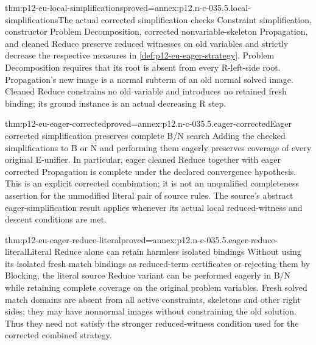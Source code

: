\begin{hblemma}{thm:p12-eu-local-simplifications}{proved=annex:p12.n-c-035.5.local-simplifications}{The actual corrected simplification checks}
Constraint simplification, constructor Problem Decomposition, corrected
nonvariable-skeleton Propagation, and cleaned Reduce preserve reduced
witnesses on old variables and strictly decrease the respective measures
in \cref{def:p12-eu-eager-strategy}. Problem Decomposition requires
that its root is absent from every R-left-side root. Propagation's
new image is a normal subterm of an old normal solved image. Cleaned
Reduce constrains no old variable and introduces no retained fresh
binding; its ground instance is an actual decreasing R step.
\end{hblemma}

\begin{hbtheorem}{thm:p12-eu-eager-corrected}{proved=annex:p12.n-c-035.5.eager-corrected}{Eager corrected simplification preserves complete B/N search}
Adding the checked simplifications to B or N and performing them
eagerly preserves coverage of every original E-unifier. In particular,
eager cleaned Reduce together with eager corrected Propagation is
complete under the declared convergence hypothesis. This is an
explicit corrected combination; it is not an unqualified completeness
assertion for the unmodified literal pair of source rules.
The source's abstract eager-simplification result applies whenever
its actual local reduced-witness and descent conditions are met.
\cite[Theorem 4.17, p.~500]{BaaderSnyder2001}
\end{hbtheorem}

\begin{hbtheorem}{thm:p12-eu-eager-reduce-literal}{proved=annex:p12.n-c-035.5.eager-reduce-literal}{Literal Reduce alone can retain harmless isolated bindings}
Without using its isolated fresh match bindings as reduced-term
certificates or rejecting them by Blocking, the literal source Reduce
variant can be performed eagerly in B/N while retaining complete
coverage on the original problem variables. Fresh solved match domains
are absent from all active constraints, skeletons and other right sides;
they may have nonnormal images without constraining the old solution.
Thus they need not satisfy the stronger reduced-witness condition used
for the corrected combined strategy.
\cite[Proposition 4.18, p.~501]{BaaderSnyder2001}
\end{hbtheorem}

